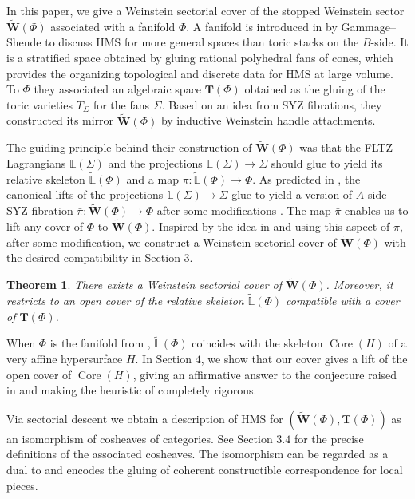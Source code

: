 \documentclass[a4paper,12pt, twoside, pdftex]{amsart}
\newtheorem{theorem}[dummy]{Theorem}
\theoremstyle{definition}
\numberwithin{equation}{section}
\newcommand{\Core}{\operatorname{Core}}
\newcommand{\bL}{\mathbb{L}}
\newcommand{\bfT}{\mathbf{T}}
\newcommand{\bfW}{\mathbf{W}}
\begin{document}
In this paper,
we give a Weinstein sectorial cover of the stopped Weinstein sector
$\widetilde{\bfW}(\Phi)$
associated with a fanifold
$\Phi$.
A fanifold is introduced in
\cite{GS1}
by Gammage--Shende to discuss HMS for more general spaces than toric stacks on the $B$-side.
It is a stratified space obtained by gluing rational polyhedral fans of cones,
which provides the organizing
topological
and
discrete
data for HMS at large volume. 
To
$\Phi$
they associated an algebraic space
$\bfT(\Phi)$
obtained as the gluing of the toric varieties
$T_\Sigma$
for the fans
$\Sigma$.
Based on an idea from SYZ fibrations,
they constructed its mirror
$\widetilde{\bfW}(\Phi)$
by inductive Weinstein handle attachments.

The guiding principle behind their construction of
$\widetilde{\bfW}(\Phi)$
was that
the FLTZ Lagrangians
$\bL(\Sigma)$
and
the projections
$\bL(\Sigma) \to \Sigma$
should glue to yield
its relative skeleton 
$\widetilde{\bL}(\Phi)$
and
a map
$\pi \colon \widetilde{\bL}(\Phi) \to \Phi$.
As predicted in
\cite[Remark 4.5]{GS1},
the canonical lifts of the projections
$\bL(\Sigma) \to \Sigma$
glue to yield a version of $A$-side SYZ fibration
$\bar{\pi} \colon \widetilde{\bfW}(\Phi) \to \Phi$
after some modifications
\cite[Theorem 1.2]{Mor}. 
The map
$\bar{\pi}$
enables us to lift any cover of
$\Phi$
to
$\widetilde{\bfW}(\Phi)$.
Inspired by the idea in
\cite[Example 1.34]{GPS2}
and
using this aspect of
$\bar{\pi}$,
after some modification,
we construct a Weinstein sectorial cover of
$\widetilde{\bfW}(\Phi)$
with the desired compatibility in Section
$3$. 

\begin{theorem} \label{thm:main}
There exists a Weinstein sectorial cover of
$\widetilde{\bfW}(\Phi)$.
Moreover,
it restricts to an open cover of the relative skeleton
$\widetilde{\bL}(\Phi)$
compatible with a cover of
$\bfT(\Phi)$.
\end{theorem}

When
$\Phi$
is the fanifold from
\cite[Example 4.23]{GS1},
$\widetilde{\bL}(\Phi)$
coincides with the skeleton
$\Core(H)$
\cite[Theorem 6.12]{GS2}
of a very affine hypersurface
$H$.
In Section
$4$,
we show that our cover gives a lift of the open cover
\cite[Corollary 4.8]{GS2}
of
$\Core(H)$,
giving an affirmative answer to the conjecture raised in
\cite[Section 2.5]{GS2}
and
making the heuristic of
\cite[Section 2.1]{GS2}
completely rigorous.

Via sectorial descent we obtain a description of HMS for
$(\widetilde{\bfW}(\Phi), \bfT(\Phi))$
as an isomorphism of cosheaves of categories.
See Section
$3.4$
for the precise definitions of the associated cosheaves.
The isomorphism can be regarded as a dual to
\cite[Theorem 5.3]{GS1}
and
encodes the gluing of coherent constructible correspondence
\cite{Kuw}
for local pieces. 
\end{document}
